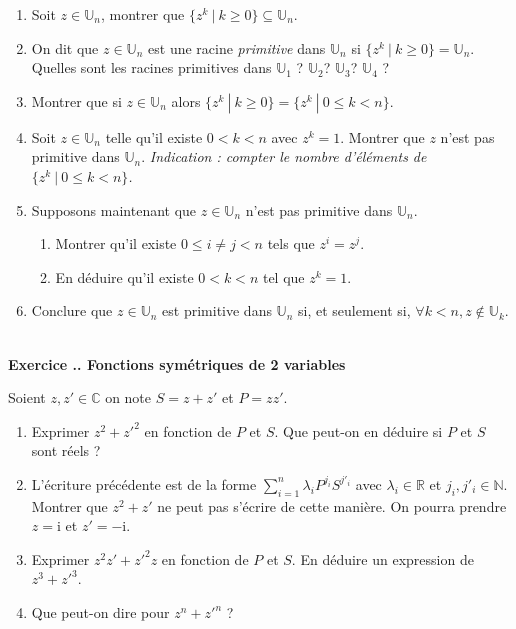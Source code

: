 \documentclass{article}
\newcommand{\mb}[1]{\mathbb{#1}}
\newcounter{exo}
\newcommand{\exercice}[1][\null]{\textbf{\\ \large Exercice \thesection.\theexo. \normalsize #1} \addtocounter{exo}{1}}
\begin{document}
\begin{enumerate}

\item Soit $z \in \mb{U}_n$, montrer que $\{z^k~|~k \ge 0\} \subseteq \mb{U}_n$.

\item On dit que $z \in \mb{U}_n$ est une racine \emph{primitive} dans $\mb{U}
_n$ si  $\{z^k~|~k \ge 0\} = \mb{U}_n$. Quelles sont les racines primitives dans  $\mb{U}_1$ ? $\mb{U}_2$? $\mb{U}_3$? $\mb{U}_4$ ?

\item Montrer que si $z \in \mb{U}_n$ alors $\{z^k~|~k \ge 0\} = \{z^k~|~0 \le k < n\}$.

\item  Soit $z \in \mb{U}_n$ telle qu'il existe $ 0 < k < n$ avec $z^k = 1$. Montrer que $z$ n'est pas primitive dans $\mb{U}_n$.
\emph{Indication : compter le nombre d'éléments de $\{z^k~|~0 \le k < n\}$.}

\item Supposons maintenant que $z \in \mb{U}_n$ n'est pas primitive dans $\mb{U}_n$.  \begin{enumerate} 

\item Montrer qu'il existe $0 \le i\neq j < n$ tels que $z^i = z^j$.
\item En déduire qu'il existe $0 < k < n$ tel que $z^k = 1$.

\end{enumerate}

\item Conclure que $z \in \mb{U}_n$ est primitive dans $\mb{U}_n$ si, et seulement si, $\forall k < n, z \not \in \mb{U}_k$.

\end{enumerate}



\exercice[Fonctions symétriques de 2 variables]

Soient $z, z' \in \mb{C}$ on note $S = z + z'$ et $P = z z'$.

\begin{enumerate}

\item Exprimer $z^2 + z'^2$ en fonction de $P$ et $S$. Que peut-on en déduire si $P$ et $S$ sont réels ?

\item L'écriture précédente est de la forme $\sum_{i=1}^n \lambda_i P^{j_i} S^{j'_i}$ avec $\lambda_i \in \mb{R}$ et $j_i, j'_i \in \mb{N}$. Montrer que $z^2 + z'$ ne peut pas s'écrire de cette manière. On pourra prendre $z = \text{i}$ et $z' = - \text{i}$.

\item Exprimer $z^2 z' + z'^2z $ en fonction de $P$ et $S$. En déduire un expression de $z^3 + z'^3$.

\item Que peut-on dire pour $z^n + z'^n$ ?

\end{enumerate}
\end{document}
